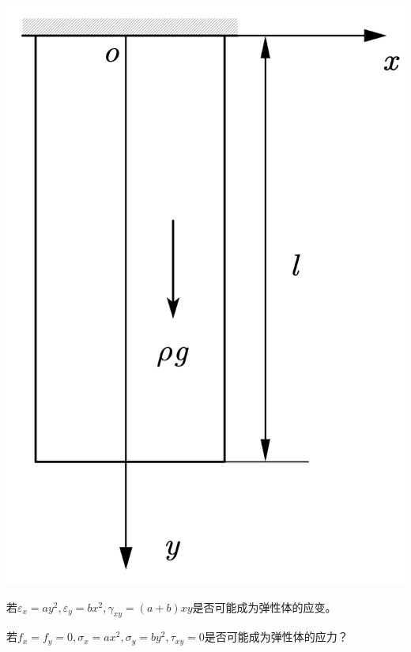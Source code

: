 \centerline{\includegraphics[scale=0.4]{figure/2-9.png}}

\begin{example}
	若$\varepsilon _x=ay^2,\varepsilon _y=bx^2,\gamma _{xy}=\left( a+b \right) xy$是否可能成为弹性体的应变。
\end{example}
\begin{remark}
	
\end{remark}
\begin{example}
若$f_x=f_y=0,\sigma _x=ax^2,\sigma _y=by^2,\tau _{xy}=0$是否可能成为弹性体的应力？
\end{example}
\begin{remark}
	
\end{remark}


